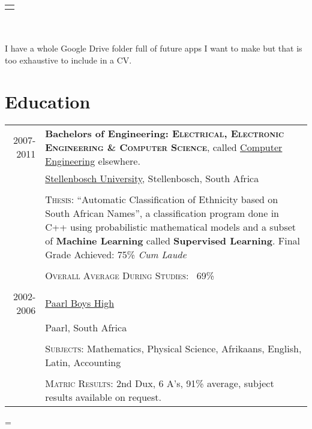 \documentclass[a4paper,10pt,notitlepage]{article}
\newenvironment{absolutelynopagebreak}
  {\par\nobreak\vfil\penalty0\vfilneg
   \vtop\bgroup}
  {\par\xdef\tpd{\the\prevdepth}\egroup
   \prevdepth=\tpd}
\begin{document}
\begin{absolutelynopagebreak}
\begin{tabular}{r|p{11cm}}
		\multicolumn{2}{c}{} \\
		
	\end{tabular}
	
	\\\\
	
    \footnotesize{I have a whole Google Drive folder full of future apps I want to make but that is too exhaustive to include in a CV}.
	
	\section{Education}
	\begin{tabular}{r|p{11cm}}
		
		\textsc{2007-2011} & \textbf{Bachelors of Engineering: \textsc{Electrical, Electronic Engineering \& Computer Science}}, called \href{https://en.wikipedia.org/wiki/Computer_engineering}{Computer Engineering} elsewhere. \\
		& \href{https://en.wikipedia.org/wiki/Stellenbosch_University}{Stellenbosch University}, Stellenbosch, South Africa \\
		
		\multicolumn{2}{c}{}\\
		
		& \textsc{Thesis}: ``Automatic Classification of Ethnicity based on South African Names'', a classification program done in C++ using probabilistic mathematical models and a subset of \textbf{Machine Learning} called \textbf{Supervised Learning}. \small Final Grade Achieved: 75\% \textit{Cum Laude} \\ \\
		&\normalsize \textsc{Overall Average During Studies}: ~69\% \\
		
		\multicolumn{2}{c}{}\\
		
		\textsc{2002-2006} & \href{https://en.wikipedia.org/wiki/Paarl_Boys_27_High_School}{Paarl Boys High} \\ & Paarl, South Africa \\ \\
		&\textsc{Subjects}: Mathematics, Physical Science, Afrikaans, English, Latin, Accounting \\ \\
		&\normalsize \textsc{Matric Results}: 2nd Dux, 6 A's, 91\% average, subject results available on request. \\
		
	\end{tabular}
	
\end{absolutelynopagebreak}
\end{document}
